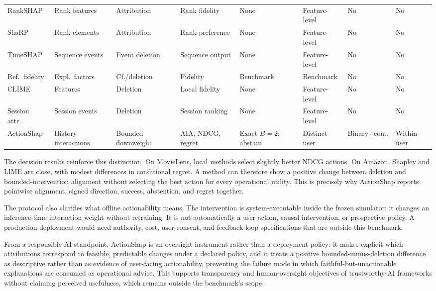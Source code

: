 \documentclass[pdflatex,sn-mathphys-num]{sn-jnl}
\theoremstyle{thmstyleone}
\theoremstyle{thmstyletwo}
\theoremstyle{thmstylethree}
\begin{document}
\begin{table}[t]
\begin{tabular}{@{}*{8}{>{\raggedright\arraybackslash}p{}}@{}}
RankSHAP \cite{chowdhury2024rankshap} & Rank features & Attribution & Rank fidelity & None & Feature-level & No & No \\
ShaRP \cite{pliatsika2025sharpl} & Rank elements & Attribution & Rank preference & None & Feature-level & No & No \\
TimeSHAP \cite{bento2021timeshap} & Sequence events & Event deletion & Sequence output & None & Feature-level & No & No \\
Ref.\ fidelity \cite{baklanov2025fidelity} & Expl.\ factors & Cf./deletion & Fidelity & Benchmark & Benchmark & No & No \\
CLIME \cite{mousavi2023clime} & Features & Deletion & Local fidelity & None & Feature-level & No & No \\
Session attr.\ \cite{bruun2025session} & Session events & Deletion & Session ranking & None & Feature-level & No & No \\
ActionShap & History interactions & Bounded downweight & AIA, NDCG, regret & Exact $B=2$; abstain & Distinct-user & Binary+cont. & Within-user \\
\bottomrule
\end{tabular}
\end{table}

The decision results reinforce this distinction. On MovieLens, local methods select slightly better NDCG actions. On Amazon, Shapley and LIME are close, with modest differences in conditional regret. A method can therefore show a positive change between deletion and bounded-intervention alignment without selecting the best action for every operational utility. This is precisely why ActionShap reports pointwise alignment, signed direction, success, abstention, and regret together.

The protocol also clarifies what offline actionability means. The intervention is system-executable inside the frozen simulator: it changes an inference-time interaction weight without retraining. It is not automatically a user action, causal intervention, or prospective policy. A production deployment would need authority, cost, user-consent, and feedback-loop specifications that are outside this benchmark.

From a responsible-AI standpoint, ActionShap is an oversight instrument rather than a deployment policy: it makes explicit which attributions correspond to feasible, predictable changes under a declared policy, and it treats a positive bounded-minus-deletion difference as descriptive rather than as evidence of user-facing actionability, preventing the failure mode in which faithful-but-unactionable explanations are consumed as operational advice. This supports transparency and human-oversight objectives of trustworthy-AI frameworks without claiming perceived usefulness, which remains outside the benchmark's scope.
\end{document}
